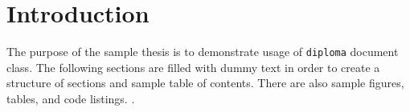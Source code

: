 \chapter{Introduction}
\label{sec:Introduction}
The purpose of the sample thesis is to demonstrate usage of \verb|diploma| document class. The following sections are filled with dummy text in order to create a structure of sections and sample table of contents. There are also sample figures, tables, and code listings. \cite{coffee}.
\endinput
